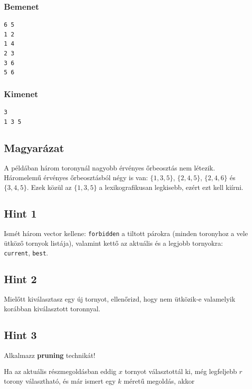 \documentclass[12pt,a4paper]{article}
\begin{document}
\subsubsection*{Bemenet}

\begin{verbatim}
6 5
1 2
1 4
2 3
3 6
5 6
\end{verbatim}

\subsubsection*{Kimenet}

\begin{verbatim}
3
1 3 5
\end{verbatim}

\subsection*{Magyarázat}

A példában három toronynál nagyobb érvényes őrbeosztás nem létezik. Háromelemű érvényes őrbeosztásból négy is van: $\{1, 3, 5\}$, $\{2, 4, 5\}$, $\{2, 4, 6\}$ és $\{3, 4, 5\}$. Ezek közül az $\{1, 3, 5\}$ a lexikografikusan legkisebb, ezért ezt kell kiírni.

\subsection*{Hint 1}

Ismét három vector kellene: \texttt{forbidden} a tiltott párokra (minden toronyhoz a vele ütköző tornyok listája), valamint kettő az aktuális és a legjobb tornyokra: \texttt{current}, \texttt{best}.

\subsection*{Hint 2}

Mielőtt kiválasztasz egy új tornyot, ellenőrizd, hogy nem ütközik-e valamelyik korábban kiválasztott toronnyal.

\subsection*{Hint 3}

Alkalmazz \textbf{pruning} technikát!

Ha az aktuális részmegoldásban eddig $x$ tornyot választottál ki, még legfeljebb $r$ torony választható, és már ismert egy $k$ méretű megoldás, akkor
\end{document}
